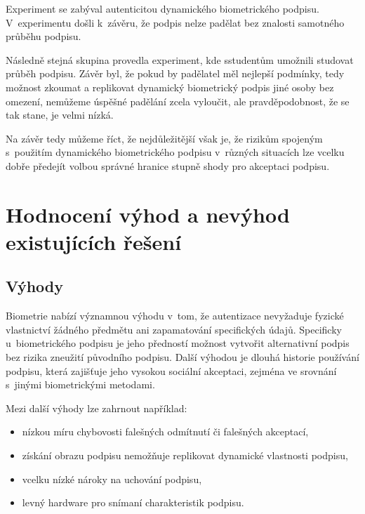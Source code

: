 Experiment se zabýval autenticitou dynamického biometrického podpisu.
V~experimentu došli k~závěru, že podpis nelze padělat bez znalosti samotného průběhu podpisu.~\cite{6986974} %

Následně stejná skupina provedla experiment, kde sstudentům umožnili studovat průběh podpisu.
Závěr byl, že pokud by padělatel měl nejlepší podmínky, tedy možnost zkoumat a replikovat dynamický biometrický podpis jiné osoby bez omezení, 
nemůžeme úspěšné padělání zcela vyloučit, ale pravděpodobnost, že se tak stane, je velmi nízká.~\cite{8585636} %

Na závěr tedy můžeme říct, že nejdůležitější však je, že rizikům spojeným s~použitím dynamického biometrického podpisu v~různých situacích lze vcelku dobře 
předejít volbou správné hranice stupně shody pro akceptaci podpisu.~\cite{8585636} %

\section{Hodnocení výhod a nevýhod existujících řešení}
\subsection*{Výhody}
Biometrie nabízí významnou výhodu v~tom, že autentizace nevyžaduje fyzické vlastnictví žádného předmětu ani zapamatování specifických údajů. 
Specificky u~biometrického podpisu je jeho předností možnost vytvořit alternativní podpis bez rizika zneužití původního podpisu. 
Další výhodou je dlouhá historie používání podpisu, která zajišťuje jeho vysokou sociální akceptaci, zejména ve srovnání s~jinými biometrickými metodami. 
\newline

\noindent
Mezi další výhody lze zahrnout například:

\begin{itemize}
  \item nízkou míru chybovosti falešných odmítnutí či falešných akceptací,
  \item získání obrazu podpisu nemožňuje replikovat dynamické vlastnosti podpisu,
  \item vcelku nízké nároky na uchování podpisu,
  \item levný hardware pro snímaní charakteristik podpisu.
\end{itemize}


